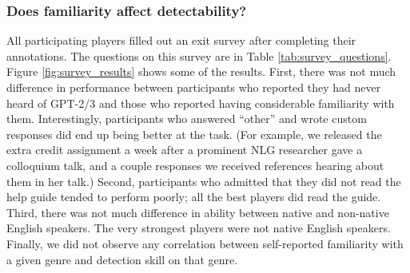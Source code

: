 \subsubsection{Does familiarity affect detectability?}
All participating players filled out an exit survey after completing their annotations. The questions on this survey are in Table \ref{tab:survey_questions}.
Figure \ref{fig:survey_results} shows some of the results.
First, there was not much difference in performance between participants who reported they had never heard of GPT-2/3 and those who reported having considerable familiarity with them.
Interestingly, participants who answered ``other'' and wrote custom responses did end up being better at the task.
(For example, we released the extra credit assignment a week after a prominent NLG researcher gave a colloquium talk, and a couple responses we received references hearing about them in her talk.)
Second, participants who admitted that they did not read the help guide tended to perform poorly; all the best players did read the guide.
Third, there was not much difference in ability between native and non-native English speakers.
The very strongest players were not native English speakers.
Finally, we did not observe any correlation between self-reported familiarity with a given genre and detection skill on that genre.

